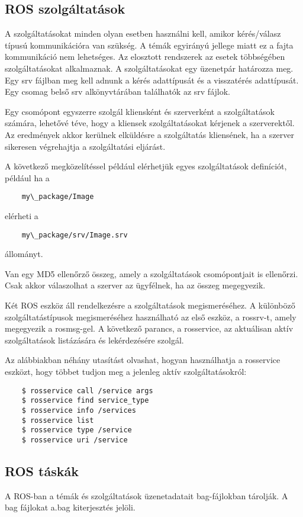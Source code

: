 \documentclass{article}
\begin{document}
\subsection{ROS szolgáltatások}
A szolgáltatásokat minden olyan esetben használni kell, amikor kérés/válasz típusú kommunikációra van szükség. A témák egyirányú jellege miatt ez a fajta kommunikáció nem lehetséges. Az elosztott rendszerek az esetek többségében szolgáltatásokat alkalmaznak. A szolgáltatásokat egy üzenetpár határozza meg. Egy srv fájlban meg kell adnunk a kérés adattípusát és a visszatérés adattípusát. Egy csomag belső srv alkönyvtárában találhatók az srv fájlok.

Egy csomópont egyszerre szolgál kliensként és szerverként a szolgáltatások számára, lehetővé téve, hogy a kliensek szolgáltatásokat kérjenek a szerverektől. Az eredmények akkor kerülnek elküldésre a szolgáltatás kliensének, ha a szerver sikeresen végrehajtja a szolgáltatási eljárást.

A következő megközelítéssel például elérhetjük egyes szolgáltatások definíciót, például ha a \begin{verbatim}
    my\_package/Image
\end{verbatim} elérheti a 
\begin{verbatim}
    my\_package/srv/Image.srv
\end{verbatim} állományt.

Van egy MD5 ellenőrző összeg, amely a szolgáltatások csomópontjait is ellenőrzi. Csak akkor válaszolhat a szerver az ügyfélnek, ha az összeg megegyezik.

Két ROS eszköz áll rendelkezésre a szolgáltatások megismeréséhez. A különböző szolgáltatástípusok megismeréséhez használható az első eszköz, a rossrv-t, amely megegyezik a rosmsg-gel. A következő parancs, a rosservice, az aktuálisan aktív szolgáltatások listázására és lekérdezésére szolgál.

Az alábbiakban néhány utasítást olvashat, hogyan használhatja a rosservice eszközt, hogy többet tudjon meg a jelenleg aktív szolgáltatásokról:
\begin{verbatim}
    $ rosservice call /service args
    $ rosservice find service_type
    $ rosservice info /services
    $ rosservice list
    $ rosservice type /service
    $ rosservice uri /service
\end{verbatim}

\subsection{ROS táskák}
A ROS-ban a témák és szolgáltatások üzenetadatait bag-fájlokban tárolják. A bag fájlokat a.bag kiterjesztés jelöli.
\end{document}
